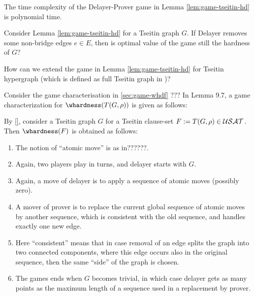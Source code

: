 \documentclass{report}
\begin{document}
\begin{conj}\label{con:hd2}
The time complexity of the Delayer-Prover game in Lemma \ref{lem:game-tseitin-hd} is polynomial time.
\end{conj}

\begin{quest}\label{que:gamehd-move}
Consider Lemma \ref{lem:game-tseitin-hd} for a Tseitin graph $G$. If Delayer removes some non-bridge edges $e \in E$, then is optimal value of the game still the hardness of $G$?
\end{quest}

\begin{quest}\label{que:gamehd}
How can we extend the game in Lemma \ref{lem:game-tseitin-hd} for Tseitin hypergraph (which is defined as full Tseitin graph in \cite{BeyersdorffGwynneKullmann2013PHPER})?
\end{quest}

Consider the game characterisation in \ref{sec:game-whdf} ???
In \cite{} Lemma 9.7, a game characterization for $\whardness(T(G,\rho))$ is given as follows:

\begin{lem}\label{lem:characwhdTs}
  By \ref{}, consider  a Tseitin graph $G$ for a Tseitin clause-set $F :=T(G,\rho) \in \mathcal{USAT}$. Then $\whardness(F)$ is obtained as follows:
  \begin{enumerate}
  \item The notion of ``atomic move'' is as in??????.
  \item Again, two players play in turns, and delayer starts with $G$.
  \item Again, a move of delayer is to apply a sequence of atomic moves (possibly zero).
  \item A mover of prover is to replace the current global sequence of atomic moves by another sequence, which is consistent with the old sequence, and handles exactly one new edge.
  \item Here ``consistent'' means that in case removal of an edge splits the graph into two connected components, where this edge occurs also in the original sequence, then the same ``side'' of the graph is chosen.
  \item The games ends when $G$ becomes trivial, in which case delayer gets as many points as the maximum length of a sequence used in a replacement by prover.
  \end{enumerate}
\end{lem}
\end{document}
